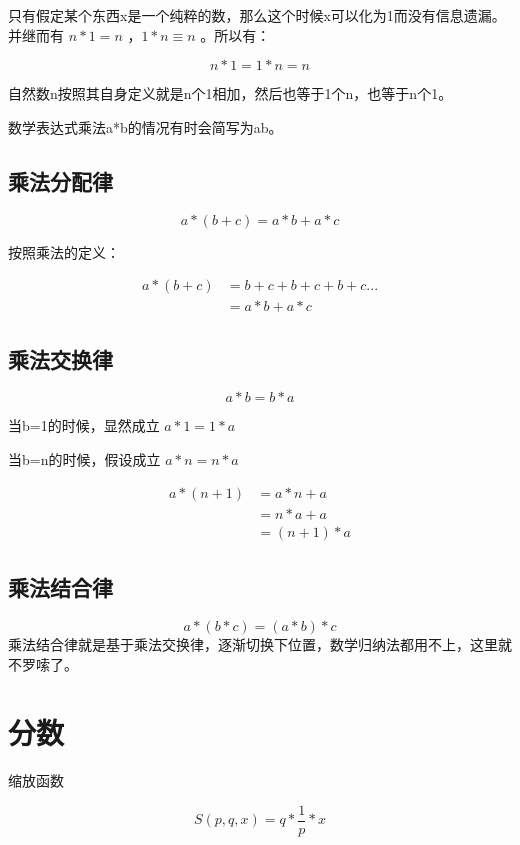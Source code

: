 \documentclass[12pt,oneside]{book}
\begin{document}
只有假定某个东西x是一个纯粹的数，那么这个时候x可以化为1而没有信息遗漏。并继而有 $n*1 = n$ ，$1*n \equiv n$ 。所以有：

\[
n*1 = 1*n =n
\]

自然数n按照其自身定义就是n个1相加，然后也等于1个n，也等于n个1。

数学表达式乘法a*b的情况有时会简写为ab。



\subsection{乘法分配律}
\begin{equation}
a*(b + c) = a*b + a*c
\end{equation}

按照乘法的定义：

\begin{align*}
a*(b+c) &= b+c + b+ c + b +c ...\\
&=a*b + a*c
\end{align*}



\subsection{乘法交换律}
\begin{equation}
a * b = b * a
\end{equation}

当b=1的时候，显然成立 $a*1 = 1*a$

当b=n的时候，假设成立 $a*n=n*a$

\begin{align*}
a*(n+1) &= a*n +a \\
&=n*a +a\\
&=(n+1)*a
\end{align*}


\subsection{乘法结合律}
\begin{equation}
a * (b * c) = (a * b) * c
\end{equation}
乘法结合律就是基于乘法交换律，逐渐切换下位置，数学归纳法都用不上，这里就不罗嗦了。


\section{分数}
缩放函数 

\begin{equation}
S(p,q,x) = q* \frac{1}{p} *x
\end{equation}
\end{document}
